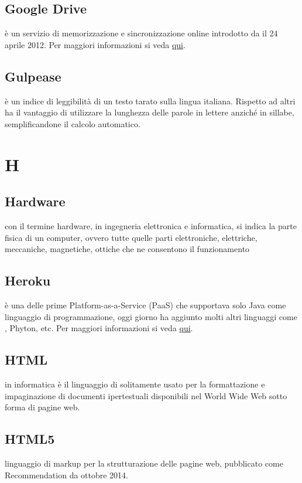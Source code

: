 \documentclass[12pt,a4paper]{article}
\begin{document}
\subsection{Google Drive} 
 è un servizio di memorizzazione e sincronizzazione online introdotto da  il 24 aprile 2012. Per maggiori informazioni si veda \href{https://it.wikipedia.org/wiki/Google_Drive}{qui}.

\subsection{Gulpease} 
 è un indice di leggibilità di un testo tarato sulla lingua italiana. Rispetto ad altri ha il vantaggio di utilizzare la lunghezza delle parole in lettere anziché in sillabe, semplificandone il calcolo automatico.


\newpage

\section{H}


\subsection{Hardware} 
con il termine hardware, in ingegneria elettronica e informatica, si indica la parte fisica di un computer, ovvero tutte quelle parti elettroniche, elettriche, meccaniche, magnetiche, ottiche che ne consentono il funzionamento\\	

\subsection{Heroku} 
 è una  delle prime  Platform-as-a-Service (PaaS) che supportava solo Java come linguaggio di programmazione, oggi giorno ha aggiunto molti altri linguaggi come , Phyton, etc. Per maggiori informazioni si veda \href{https://www.heroku.com}{qui}.

\subsection{HTML} 
 in informatica è il linguaggio di  solitamente usato per la formattazione e impaginazione di documenti ipertestuali disponibili nel World Wide Web sotto forma di pagine web.

\subsection{HTML5} 
 linguaggio di markup per la strutturazione delle pagine web, pubblicato come  Recommendation da ottobre 2014.
\end{document}
